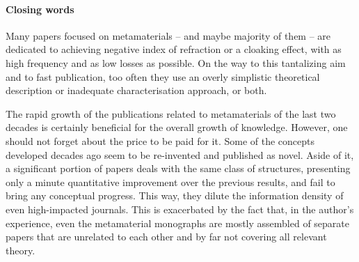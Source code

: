 

\paragraph{Closing words} 
Many papers focused on metamaterials -- and maybe majority of them -- are dedicated to achieving negative index of refraction or a cloaking effect, with as high frequency and as low losses as possible.
On the way to this tantalizing aim and to fast publication, too often they use an overly simplistic theoretical description or inadequate characterisation approach, or both. %

The rapid growth of the publications related to metamaterials of the last two decades is certainly beneficial for the overall growth of knowledge. However, one should not forget about the price to be paid for it. Some of the concepts developed decades ago seem to be re-invented and published as novel. Aside of it, a significant portion of papers deals with the same class of structures, presenting only a minute quantitative improvement over the previous results, and fail to bring any conceptual progress. This way, they dilute the information density of even high-impacted journals. This is exacerbated by the fact that, in the author's experience, even the metamaterial monographs are mostly assembled of separate papers that are unrelated to each other and by far not covering all relevant theory.

